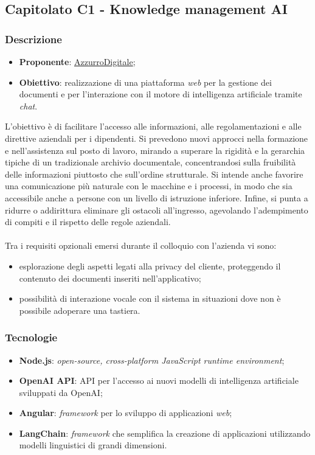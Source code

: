 \subsection{Capitolato C1 - Knowledge management AI}


\subsubsection{Descrizione}
\begin{itemize}
    \item \textbf{Proponente}: \href{https://www.azzurrodigitale.com/}{AzzurroDigitale};
    \item \textbf{Obiettivo}: realizzazione di una piattaforma \textit{web} per la gestione dei documenti e per l'interazione con il motore di intelligenza artificiale tramite \textit{chat}.
\end{itemize}
L'obiettivo è di facilitare l'accesso alle informazioni, alle regolamentazioni e alle direttive aziendali per i dipendenti. 
Si prevedono nuovi approcci nella formazione e nell'assistenza sul posto di lavoro, mirando a superare la rigidità e la gerarchia tipiche di un tradizionale archivio documentale, concentrandosi sulla fruibilità delle informazioni piuttosto che sull'ordine strutturale. 
Si intende anche favorire una comunicazione più naturale con le macchine e i processi, in modo che sia accessibile anche a persone con un livello di istruzione inferiore. 
Infine, si punta a ridurre o addirittura eliminare gli ostacoli all'ingresso, agevolando l'adempimento di compiti e il rispetto delle regole aziendali. \\
\\
\noindent
Tra i requisiti opzionali emersi durante il colloquio con l'azienda vi sono:
\begin{itemize}
    \item esplorazione degli aspetti legati alla privacy del cliente, proteggendo il contenuto dei documenti inseriti nell'applicativo;
    \item possibilità di interazione vocale con il sistema in situazioni dove non è possibile adoperare una tastiera.
\end{itemize}

\subsubsection{Tecnologie}
\begin{itemize}
    \item \textbf{Node.js}: \textit{open-source, cross-platform JavaScript runtime environment};
    \item \textbf{OpenAI API}: API per l'accesso ai nuovi modelli di intelligenza artificiale sviluppati da OpenAI;
    \item \textbf{Angular}: \textit{framework} per lo sviluppo di applicazioni \textit{web};
    \item \textbf{LangChain}: \textit{framework} che semplifica la creazione di applicazioni utilizzando modelli linguistici di grandi dimensioni.
\end{itemize}


